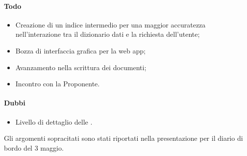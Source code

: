 \paragraph{Todo}
\begin{itemize}
	\item Creazione di un indice intermedio per una maggior accuratezza nell'interazione tra il dizionario dati e la richiesta dell'utente;
	\item Bozza di interfaccia grafica per la web app;
	\item Avanzamento nella scrittura dei documenti;
	\item Incontro con la Proponente.
\end{itemize}

\paragraph{Dubbi}
\begin{itemize}
	\item Livello di dettaglio delle \NdP.
\end{itemize}

\vspace{0.5\baselineskip}
\par Gli argomenti sopracitati sono stati riportati nella presentazione per il diario di bordo del 3 maggio.